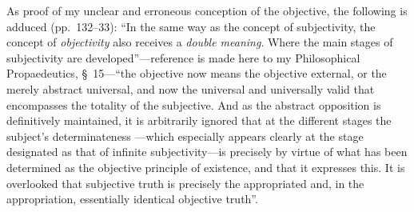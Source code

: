 \documentclass[12pt]{book}
\newcommand{\opage}[1]{\marginnote{\footnotesize\textit{[#1]}}}
\begin{document}
As proof of my unclear and erroneous conception of the objective, the
following is adduced (pp.\ 132--33): ``In the same way as the concept of
subjectivity, the concept of \emph{objectivity} also receives a \emph{double
meaning}. Where the main stages of subjectivity are
developed''---reference is made here to my Philosophical Propaedeutics,
\S~15---``the objective now means the objective external, or the merely
abstract universal, and now the universal and universally valid that
encompasses the totality of the subjective. And as the abstract opposition
is definitively maintained, it is arbitrarily ignored that at the different
stages the subject's determinateness
\opage{12}\setcounter{footnote}{0}%
---which especially appears clearly at the stage designated as that of
infinite subjectivity---is precisely by virtue of what has been determined
as the objective principle of existence, and that it expresses this. It is
overlooked that subjective truth is precisely the appropriated and, in the
appropriation, essentially identical objective truth''.
\end{document}
